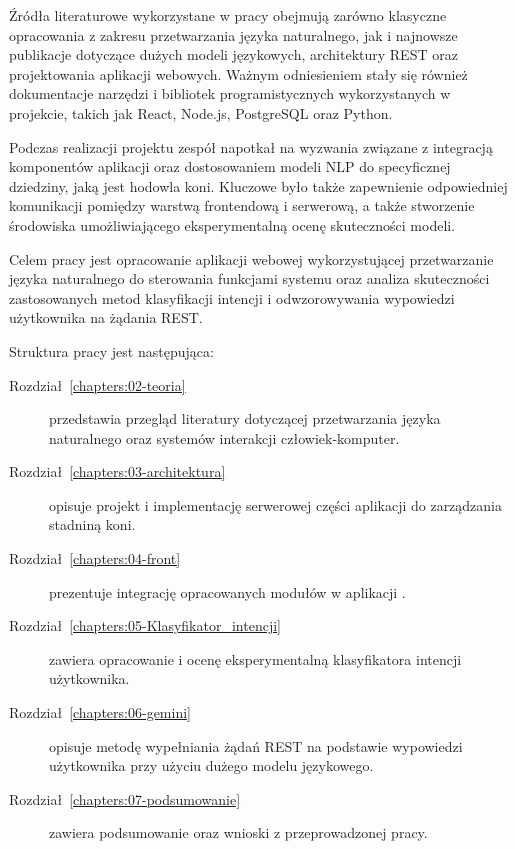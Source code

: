 Źródła literaturowe wykorzystane w pracy obejmują zarówno klasyczne opracowania z zakresu przetwarzania języka naturalnego, jak i najnowsze publikacje dotyczące dużych modeli językowych, architektury REST oraz projektowania aplikacji webowych. Ważnym odniesieniem stały się również dokumentacje narzędzi i bibliotek programistycznych wykorzystanych w projekcie, takich jak React, Node.js, PostgreSQL oraz Python.

Podczas realizacji projektu zespół napotkał na wyzwania związane z integracją komponentów aplikacji oraz dostosowaniem modeli NLP do specyficznej dziedziny, jaką jest hodowla koni. Kluczowe było także zapewnienie odpowiedniej komunikacji pomiędzy warstwą frontendową i serwerową, a także stworzenie środowiska umożliwiającego eksperymentalną ocenę skuteczności modeli.

Celem pracy jest opracowanie aplikacji webowej  wykorzystującej przetwarzanie języka naturalnego do sterowania funkcjami systemu oraz analiza skuteczności zastosowanych metod klasyfikacji intencji i odwzorowywania wypowiedzi użytkownika na żądania REST.

	

	Struktura pracy jest następująca:
	\begin{description}
		\item[Rozdział~\ref{chapters:02-teoria} ] przedstawia przegląd literatury dotyczącej przetwarzania języka naturalnego oraz systemów interakcji człowiek-komputer.
		\item[Rozdział~\ref{chapters:03-architektura} ] opisuje projekt i implementację serwerowej części aplikacji do zarządzania stadniną koni.
		\item[Rozdział~\ref{chapters:04-front} ] prezentuje integrację opracowanych modułów w aplikacji .
		\item[Rozdział~\ref{chapters:05-Klasyfikator_intencji} ] zawiera opracowanie i ocenę eksperymentalną klasyfikatora intencji użytkownika.
		\item[Rozdział~\ref{chapters:06-gemini} ] opisuje metodę wypełniania żądań REST na podstawie wypowiedzi użytkownika przy użyciu dużego modelu językowego.
		\item[Rozdział~\ref{chapters:07-podsumowanie} ] zawiera podsumowanie oraz wnioski z przeprowadzonej pracy.
	\end{description}

